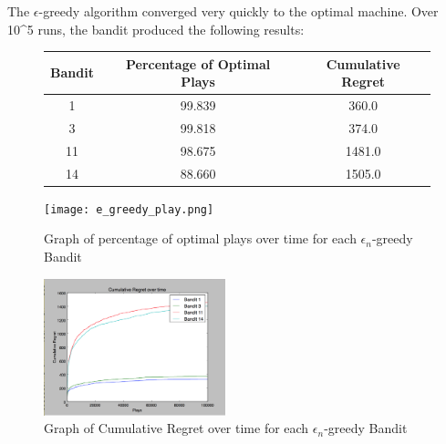 The $\epsilon$-greedy algorithm converged very quickly to the optimal machine. Over 10^5 runs, the bandit produced the following results:

\begin{figure}[htb]
  \centering
  \begin{tabular}{|c|c|c|} 
    \hline \hline 
    Bandit & Percentage of Optimal Plays &  Cumulative Regret \\ 
    \hline 
     1 & 99.839 & 360.0 \\
     3 & 99.818 & 374.0 \\
     11 & 98.675 & 1481.0 \\
     14 & 88.660 & 1505.0 \\
    \hline \hline
  \end{tabular}
  \label{tab:Statistics for $\epsilon_n$-greedy Bandits}
\end{figure}

\begin{figure}[htb]
  \centering 
  \texttt{[image: e\_greedy\_play.png]}
  \caption{Graph of percentage of optimal plays over time for each $\epsilon_n$-greedy Bandit}
  \label{fig:$\epsilon_n$-greedy Percentage of optimal plays over time}
\end{figure}
\begin{figure}[htb]
  \centering 
  \includegraphics[width=0.47\textwidth]{e_greedy_regret.png}
  \caption{Graph of Cumulative Regret over time for each $\epsilon_n$-greedy Bandit}
  \label{fig:$\epsilon_n$-greedy Cumulative Regret over time}
\end{figure}

